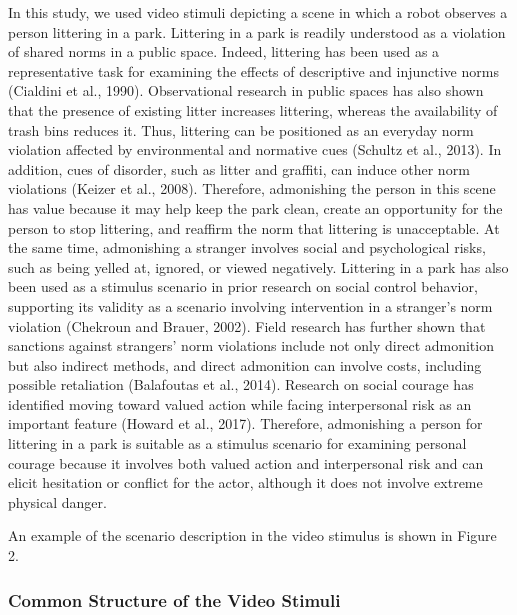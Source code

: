 \documentclass[
]{article}
\begin{document}
In this study, we used video stimuli depicting a scene in which a robot
observes a person littering in a park. Littering in a park is readily
understood as a violation of shared norms in a public space. Indeed,
littering has been used as a representative task for examining the
effects of descriptive and injunctive norms (Cialdini et al., 1990).
Observational research in public spaces has also shown that the presence
of existing litter increases littering, whereas the availability of
trash bins reduces it. Thus, littering can be positioned as an everyday
norm violation affected by environmental and normative cues (Schultz et
al., 2013). In addition, cues of disorder, such as litter and graffiti,
can induce other norm violations (Keizer et al., 2008). Therefore,
admonishing the person in this scene has value because it may help keep
the park clean, create an opportunity for the person to stop littering,
and reaffirm the norm that littering is unacceptable. At the same time,
admonishing a stranger involves social and psychological risks, such as
being yelled at, ignored, or viewed negatively. Littering in a park has
also been used as a stimulus scenario in prior research on social
control behavior, supporting its validity as a scenario involving
intervention in a stranger's norm violation (Chekroun and Brauer, 2002).
Field research has further shown that sanctions against strangers' norm
violations include not only direct admonition but also indirect methods,
and direct admonition can involve costs, including possible retaliation
(Balafoutas et al., 2014). Research on social courage has identified
moving toward valued action while facing interpersonal risk as an
important feature (Howard et al., 2017). Therefore, admonishing a person
for littering in a park is suitable as a stimulus scenario for examining
personal courage because it involves both valued action and
interpersonal risk and can elicit hesitation or conflict for the actor,
although it does not involve extreme physical danger.

An example of the scenario description in the video stimulus is shown in
Figure 2.

\subsubsection{Common Structure of the Video
Stimuli}\label{common-structure-of-the-video-stimuli}
\end{document}

